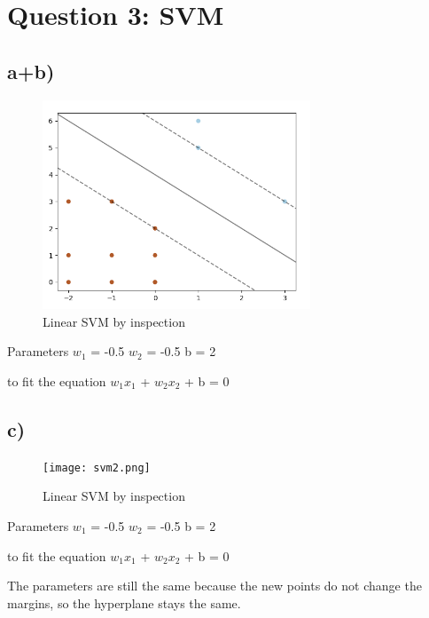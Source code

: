 \section*{Question 3: SVM}

\subsection*{a+b)}
\begin{figure}[H]
\caption{Linear SVM by inspection}
\includegraphics[width=8cm]{svm1.png}
\centering
\end{figure}

\begin{center}
Parameters $w_1$ = -0.5
$w_2$ = -0.5
b = 2

to fit the equation $w_1 x_1$ + $w_2 x_2$ + b = 0
\end{center}

\subsection*{c)}
\begin{figure}[H]
\caption{Linear SVM by inspection}
\texttt{[image: svm2.png]}
\centering
\end{figure}

\begin{center}
Parameters $w_1$ = -0.5
$w_2$ = -0.5
b = 2

to fit the equation $w_1 x_1$ + $w_2 x_2$ + b = 0\\
\end{center}
The parameters are still the same because the new points do not change the margins, so the hyperplane stays the same.